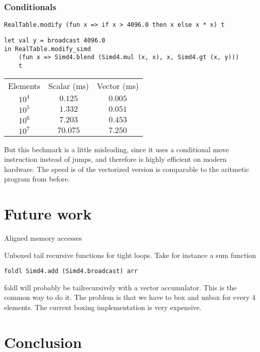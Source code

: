 \documentclass{article}
\begin{document}
\subsubsection{Conditionals}

\begin{lstlisting}
RealTable.modify (fun x => if x > 4096.0 then x else x * x) t
\end{lstlisting}

\begin{lstlisting}
let val y = broadcast 4096.0
in RealTable.modify_simd
    (fun x => Simd4.blend (Simd4.mul (x, x), x, Simd4.gt (x, y)))
    t
\end{lstlisting}

\begin{center}
\begin{tabular}{ c c c }
    Elements & Scalar (ms) & Vector (ms) \\
    $10^4$ & $0.125$ & $0.005$ \\
    $10^5$ & $1.332$ & $0.051$ \\
    $10^6$ & $7.203$ & $0.453$ \\
    $10^7$ & $70.075$ & $7.250$
\end{tabular}
\end{center}

But this bechmark is a little misleading, since it uses a conditional move instruction instead of jumps, and therefore is highly efficient on modern hardware. The speed is of the vectorized version is comparable to the aritmetic program from before.

\section{Future work}

Aligned memory accesses

Unboxed tail recursive functions for tight loops. Take for instance a sum function

\begin{lstlisting}
foldl Simd4.add (Simd4.broadcast) arr
\end{lstlisting}

foldl will probably be tailrecursively with a vector accumulator. This is the common way to do it. The problem is that we have to box and unbox for every 4 elements. The current boxing implementation is very expensive.

\section{Conclusion}




\end{document}
